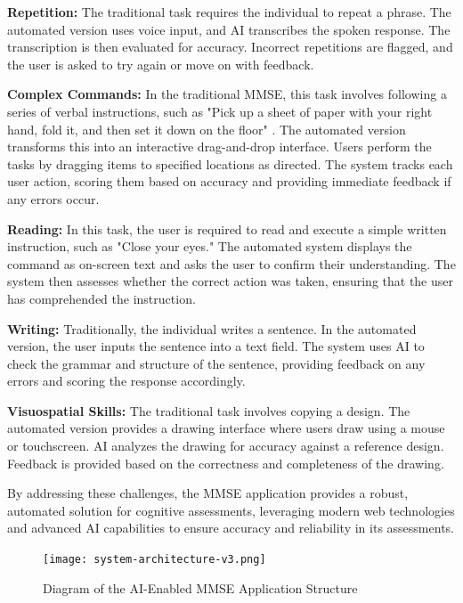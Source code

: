 \textbf{Repetition:} The traditional task requires the individual to repeat a phrase. The automated version uses voice input, and AI transcribes the spoken response. The transcription is then evaluated for accuracy. Incorrect repetitions are flagged, and the user is asked to try again or move on with feedback.

\textbf{Complex Commands:} In the traditional MMSE, this task involves following a series of verbal instructions, such as "Pick up a sheet of paper with your right hand, fold it, and then set it down on the floor" \cite{Folstein1975}. The automated version transforms this into an interactive drag-and-drop interface. Users perform the tasks by dragging items to specified locations as directed. The system tracks each user action, scoring them based on accuracy and providing immediate feedback if any errors occur.

\textbf{Reading:} In this task, the user is required to read and execute a simple written instruction, such as "Close your eyes." The automated system displays the command as on-screen text and asks the user to confirm their understanding. The system then assesses whether the correct action was taken, ensuring that the user has comprehended the instruction.

\textbf{Writing:} Traditionally, the individual writes a sentence. In the automated version, the user inputs the sentence into a text field. The system uses AI to check the grammar and structure of the sentence, providing feedback on any errors and scoring the response accordingly.

\textbf{Visuospatial Skills:} The traditional task involves copying a design. The automated version provides a drawing interface where users draw using a mouse or touchscreen. AI analyzes the drawing for accuracy against a reference design. Feedback is provided based on the correctness and completeness of the drawing.

By addressing these challenges, the MMSE application provides a robust, automated solution for cognitive assessments, leveraging modern web technologies and advanced AI capabilities to ensure accuracy and reliability in its assessments.

\begin{figure}[h!]
\begin{center}
\texttt{[image: system-architecture-v3.png]}
\caption{Diagram of the AI-Enabled MMSE Application Structure}
\label{fig:system-architecture}
\end{center}
\end{figure}

